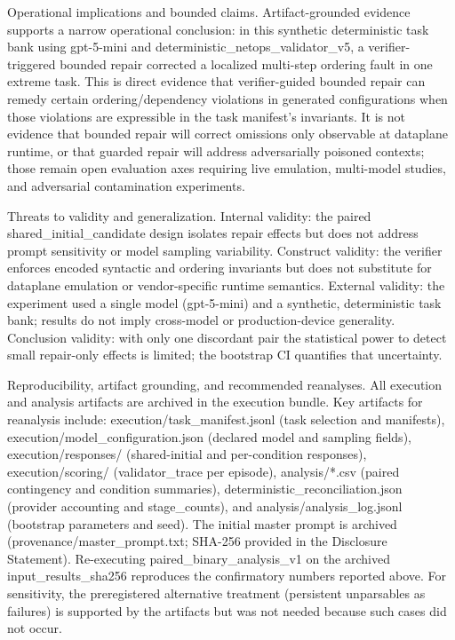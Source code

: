 \documentclass[conference]{IEEEtran}
\begin{document}
Operational implications and bounded claims. Artifact-grounded evidence supports a narrow operational conclusion: in this synthetic deterministic task bank using gpt-5-mini and deterministic\_netops\_validator\_v5, a verifier-triggered bounded repair corrected a localized multi-step ordering fault in one extreme task. This is direct evidence that verifier-guided bounded repair can remedy certain ordering/dependency violations in generated configurations when those violations are expressible in the task manifest's invariants. It is not evidence that bounded repair will correct omissions only observable at dataplane runtime, or that guarded repair will address adversarially poisoned contexts; those remain open evaluation axes requiring live emulation, multi-model studies, and adversarial contamination experiments.

Threats to validity and generalization. Internal validity: the paired shared\_initial\_candidate design isolates repair effects but does not address prompt sensitivity or model sampling variability. Construct validity: the verifier enforces encoded syntactic and ordering invariants but does not substitute for dataplane emulation or vendor-specific runtime semantics. External validity: the experiment used a single model (gpt-5-mini) and a synthetic, deterministic task bank; results do not imply cross-model or production-device generality. Conclusion validity: with only one discordant pair the statistical power to detect small repair-only effects is limited; the bootstrap CI quantifies that uncertainty.

Reproducibility, artifact grounding, and recommended reanalyses. All execution and analysis artifacts are archived in the execution bundle. Key artifacts for reanalysis include: execution/task\_manifest.jsonl (task selection and manifests), execution/model\_configuration.json (declared model and sampling fields), execution/responses/ (shared-initial and per-condition responses), execution/scoring/ (validator\_trace per episode), analysis/*.csv (paired contingency and condition summaries), deterministic\_reconciliation.json (provider accounting and stage\_counts), and analysis/analysis\_log.jsonl (bootstrap parameters and seed). The initial master prompt is archived (provenance/master\_prompt.txt; SHA-256 provided in the Disclosure Statement). Re-executing paired\_binary\_analysis\_v1 on the archived input\_results\_sha256 reproduces the confirmatory numbers reported above. For sensitivity, the preregistered alternative treatment (persistent unparsables as failures) is supported by the artifacts but was not needed because such cases did not occur.
\end{document}
